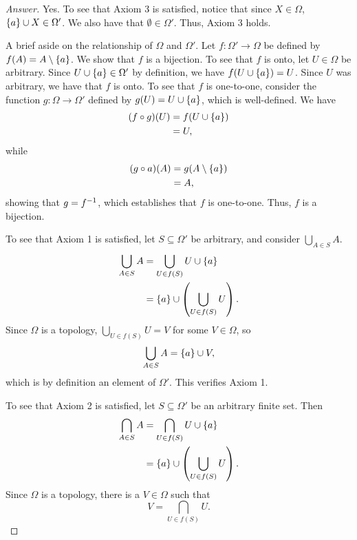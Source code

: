 \begin{proof}[Answer]
    Yes. To see that Axiom 3 is satisfied, notice that since $X \in \Omega$,
    $\{a\} \cup X \in \Omega'$. We also have that $\emptyset \in \Omega'$.
    Thus, Axiom 3 holds.

    A brief aside on the relationship of $\Omega$ and $\Omega'$. Let $f :
    \Omega' \to \Omega$ be defined by $f(A) = A \setminus \{a\}$. We show that
    $f$ is a bijection. To see that $f$ is onto, let $U \in \Omega$ be
    arbitrary. Since $U \cup \{a\} \in \Omega'$ by definition, we have $f(U
    \cup \{a\}) = U$. Since $U$ was arbitrary, we have that $f$ is onto. To
    see that $f$ is one-to-one, consider the function $g : \Omega \to \Omega'$
    defined by $g(U) = U \cup \{a\}$, which is well-defined. We have
    \begin{align*}
        (f \circ g)(U) &= f(U\cup \{a\}) \\
                       &= U,
    \end{align*}
    while
    \begin{align*}
        (g \circ a)(A) &= g(A \setminus \{a\}) \\
                       &= A,
    \end{align*}
    showing that $g = f^{-1}$, which establishes that $f$ is one-to-one. Thus,
    $f$ is a bijection.

    To see that Axiom 1 is satisfied, let $S \subseteq \Omega'$ be arbitrary,
    and consider $\bigcup_{A \in S} A$.     
    \begin{align*}
        \bigcup_{A \in S} A &= \bigcup_{U \in f(S)} U \cup \{a\} \\
                            &= \{a\} \cup \left( \bigcup_{U \in f(S)} U
                            \right). 
    \end{align*}
    Since $\Omega$ is a topology, $\bigcup_{U \in f(S)} U = V$ for some $V \in
    \Omega$, so
    \[
        \bigcup_{A \in S} A = \{a\} \cup V,
    \]
    which is by definition an element of $\Omega'$. This verifies Axiom 1.

    To see that Axiom 2 is satisfied, let $S \subseteq \Omega'$ be an arbitrary
    finite set. Then
    \begin{align*}
        \bigcap_{A \in S} A &= \bigcap_{U \in f(S)} U \cup \{a\} \\
        &= \{a\} \cup \left( \bigcup_{U \in f(S)} U \right).
    \end{align*}
    Since $\Omega$ is a topology, there is a $V \in \Omega$ such that
    \[
        V = \bigcap_{U \in f(S)} U.
    \]

    
\end{proof}

